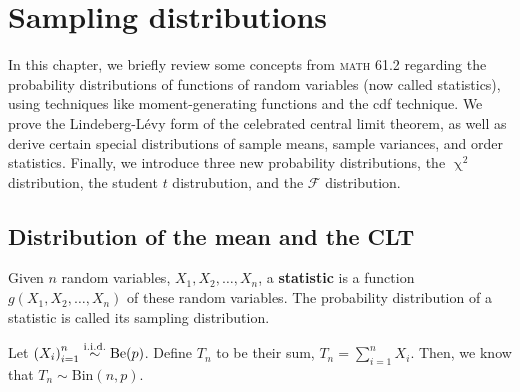 \chapter{Sampling distributions}
In this chapter, we briefly review some concepts from \textsc{math} 61.2 regarding the probability distributions of functions of random variables (now called statistics), using techniques like moment-generating functions and the cdf technique. 
We prove the Lindeberg-L\'evy form of the celebrated central limit theorem, as well as derive certain special distributions of sample means, sample variances, and order statistics. 
Finally, we introduce three new probability distributions, the \(\upchi^2\) distribution, the student \(t\) distrubution, and the \(\mathscr{F}\) distribution. 
\section{Distribution of the mean and the CLT}
Given \(n\) random variables, \(X_1,X_2,\ldots, X_n\), a \textbf{statistic} is a function \(g(X_1, X_2,\ldots, X_n)\) of these random variables. 
The probability distribution of a statistic is called its sampling distribution. 
\begin{example}
    Let \({(X_i)}_{i=1}^n\stackrel{\mathrm{i.i.d.}}{\sim} \mathrm{Be}(p)\). 
    Define \(T_n\) to be their sum, \(T_n = \sum_{i=1}^n X_i\). 
    Then, we know that \(T_n \sim \mathrm{Bin}(n,p)\). 
\end{example}
